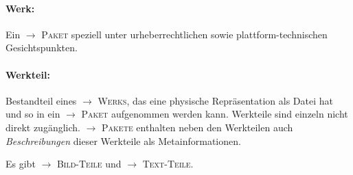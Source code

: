 \documentclass[a4paper,11pt]{article}
\newcommand{\glossar}[1]{{$\to$ \textsc{#1}}}
\begin{document}
\paragraph{Werk:} 
Ein \glossar{Paket} speziell unter urheberrechtlichen sowie
plattform-technischen Gesichtspunkten.

\paragraph{Werkteil:}
Bestandteil eines \glossar{Werks}, das eine physische Repräsentation als Datei
hat und so in ein \glossar{Paket} aufgenommen werden kann. Werkteile sind
einzeln nicht direkt zugänglich.  \glossar{Pakete} enthalten neben den
Werkteilen auch \emph{Beschreibungen} dieser Werkteile als Metainformationen.

Es gibt \glossar{Bild-Teile} und \glossar{Text-Teile}.
\end{document}
